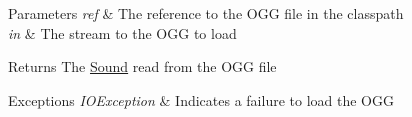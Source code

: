 \begin{DoxyParams}{Parameters}
{\em ref} & The reference to the O\+GG file in the classpath \\
\hline
{\em in} & The stream to the O\+GG to load \\
\hline
\end{DoxyParams}
\begin{DoxyReturn}{Returns}
The \mbox{\hyperlink{classorg_1_1newdawn_1_1slick_1_1_sound}{Sound}} read from the O\+GG file 
\end{DoxyReturn}

\begin{DoxyExceptions}{Exceptions}
{\em I\+O\+Exception} & Indicates a failure to load the O\+GG \\
\hline
\end{DoxyExceptions}

